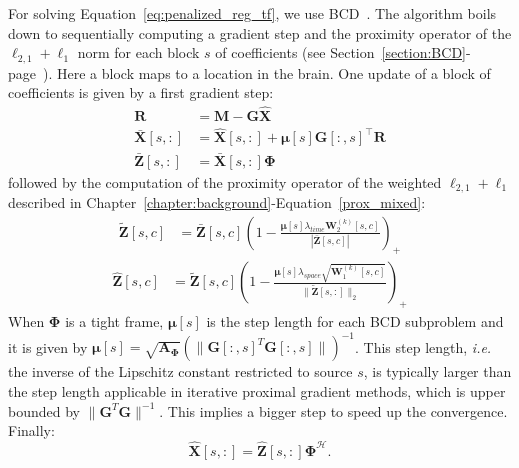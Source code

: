For solving Equation~\eqref{eq:penalized_reg_tf}, we use BCD~\cite{tseng2010approximation}. The algorithm boils down to sequentially computing a gradient step and the proximity operator of the $\ell_{2,1}+\ell_1$ norm for each block $s$ of coefficients (see Section~\ref{section:BCD}-page~\pageref{section:BCD}). Here a block maps to a location in the brain. One update of a block of coefficients is given by a first gradient step:
\begin{align} \label{eq:block_update}
    \mathbf{R} &= \mathbf{M} - \mathbf{G}\hat{\mathbf{X}} \\
    \bar{\mathbf{X}}[s,:] &= \hat{\mathbf{X}}[s,:] + \mathbf{\mu}[s]\mathbf{G}[:,s]^\top\mathbf{R} \\
    \bar{\mathbf{Z}}[s,:] &= \bar{\mathbf{X}}[s,:]\mathbf{\Phi}
\end{align}
followed by the computation of the proximity operator of the weighted $\ell_{2,1}+\ell_1$ described in Chapter~\ref{chapter:background}-Equation~\eqref{prox_mixed}:
\begin{equation} \label{prox_l1}
\begin{aligned}
    \tilde{\mathbf{Z}}[s,c] &= \bar{\mathbf{Z}}[s,c]\left(1 - \frac{\mathbf{\mu}[s]\lambda_{time}\mathbf{W}_2^{(k)}[s,c]}{|\bar{\mathbf{Z}}[s,c]|} \right)_+
\end{aligned}
\end{equation}
\begin{equation} \label{prox_l21}
\begin{aligned}
    \hat{\mathbf{Z}}[s,c] &= \tilde{\mathbf{Z}}[s,c]\left(1 - \frac{\mathbf{\mu}[s]\lambda_{space}\sqrt{\mathbf{W}_1^{(k)}[s,c]}}{\|\tilde{\mathbf{Z}}[s,:]\|_2}\right)_+
\end{aligned}
\end{equation}
When $\mathbf{\Phi}$ is a tight frame, $\mathbf{\mu}[s]$ is the step length for each BCD subproblem and it is given by $\mathbf{\mu}[s]=\sqrt{\mathbf{A}_{\mathbf{\Phi}}}(\|\mathbf{G}[:,s]^T\mathbf{G}[:,s]\|)^{-1}$. This step length, \textit{i.e.} the inverse of the Lipschitz constant restricted to source $s$, is typically larger than the step length applicable in iterative proximal gradient methods, which is upper bounded by $\|\mathbf{G}^T\mathbf{G}\|^{-1}$. This implies a bigger step to speed up the convergence.
Finally:
\begin{equation}
    \hat{\mathbf{X}}[s,:] = \hat{\mathbf{Z}}[s,:]\mathbf{\Phi}^\mathcal{H}.
\end{equation}

